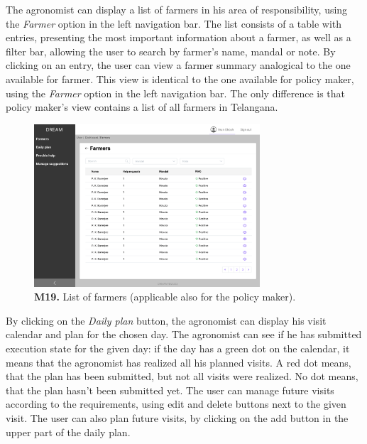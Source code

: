     The agronomist can display a list of farmers in his area of responsibility, using the \textit{Farmer} option in the left navigation bar. The list consists of a table with entries, presenting the most important information about a farmer, as well as a filter bar, allowing the user to search by farmer's name, mandal or note. By clicking on an entry, the user can view a farmer summary analogical to the one available for farmer. This view is identical to the one available for policy maker, using the \textit{Farmer} option in the left navigation bar. The only difference is that policy maker's view contains a list of all farmers in Telangana.
    \begin{figure}[H]
        \centering
        \includegraphics[width=0.75\textwidth]{mockups/Agronomist_Dashboard_Farmers.png}
        \caption{\textbf{M19.} List of farmers (applicable also for the policy maker).}
        \label{fig:agronomist-farmer-list}
    \end{figure}
    
    By clicking on the \textit{Daily plan} button, the agronomist can display his visit calendar and plan for the chosen day. The agronomist can see if he has submitted execution state for the given day: if the day has a green dot on the calendar, it means that the agronomist has realized all his planned visits. A red dot means, that the plan has been submitted, but not all visits were realized. No dot means, that the plan hasn't been submitted yet. The user can manage future visits according to the requirements, using edit and delete buttons next to the given visit. The user can also plan future visits, by clicking on the add button in the upper part of the daily plan.
    
